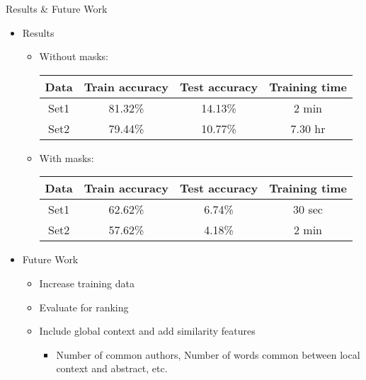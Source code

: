 \documentclass{beamer}
\begin{document}
\begin{frame}{Results \& Future Work}

  \begin{itemize}
     \item Results
        \begin{itemize}
         \item Without masks: 
       
         \newline
            \begin{tabular}{|c|c|c|c|} 
              \hline
              Data & Train accuracy & Test accuracy & Training time\\ \hline
              Set1 & 81.32\% & 14.13\% & 2 min\\  \hline
              Set2 & 79.44\% & 10.77\% & 7.30 hr\\ \hline
            \end{tabular}
                \newline
          \item With masks: 
          \newline
            \begin{tabular}{|c|c|c|c|} \hline
              Data & Train accuracy & Test accuracy & Training time\\ \hline
              Set1 & 62.62\% & 6.74\% & 30 sec\\  \hline
              Set2 & 57.62\% & 4.18\% & 2 min\\ \hline
            \end{tabular}
      \end{itemize}
    \item Future Work
     \begin{itemize}
          \item Increase training data
          \item Evaluate for ranking
          \item Include global context and add similarity features
              \begin{itemize}
                 \item Number of common authors, Number of words common between local context and abstract, etc.
               \end{itemize}
      \end{itemize}
  \end{itemize}
  
\end{frame}
\end{document}
